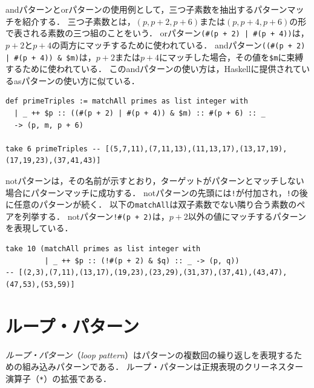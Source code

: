 andパターンとorパターンの使用例として，三つ子素数を抽出するパターンマッチを紹介する．
三つ子素数とは，$(p,p+2,p+6)$または$(p,p+4,p+6)$の形で表される素数の三つ組のことをいう．
orパターン\lstinline{(#(p + 2) | #(p + 4))}は，$p+2$と$p+4$の両方にマッチするために使われている．
andパターン\lstinline{((#(p + 2) | #(p + 4)) & $m)}は，$p+2$または$p+4$にマッチした場合，その値を\lstinline{$m}に束縛するために使われている．
このandパターンの使い方は，Haskellに提供されているasパターンの使い方に似ている．
\begin{lstlisting}[language=egison,numbers=none]
def primeTriples := matchAll primes as list integer with
  | _ ++ $p :: ((#(p + 2) | #(p + 4)) & $m) :: #(p + 6) :: _
  -> (p, m, p + 6)

take 6 primeTriples -- [(5,7,11),(7,11,13),(11,13,17),(13,17,19),(17,19,23),(37,41,43)]
\end{lstlisting}

notパターンは，その名前が示すとおり，ターゲットがパターンとマッチしない場合にパターンマッチに成功する．
notパターンの先頭には\lstinline{!}が付加され，\lstinline{!}の後に任意のパターンが続く．
以下の\lstinline{matchAll}は双子素数でない隣り合う素数のペアを列挙する．
notパターン\lstinline{!#(p + 2)}は，$p+2$以外の値にマッチするパターンを表現している．
\begin{lstlisting}[language=egison,numbers=none]
take 10 (matchAll primes as list integer with
         | _ ++ $p :: (!#(p + 2) & $q) :: _ -> (p, q))
-- [(2,3),(7,11),(13,17),(19,23),(23,29),(31,37),(37,41),(43,47),(47,53),(53,59)]
\end{lstlisting}


\section{ループ・パターン}\label{quick-loop-pat}

\emph{ループ・パターン}（\emph{loop pattern}）はパターンの複数回の繰り返しを表現するための組み込みパターンである．
ループ・パターンは正規表現のクリーネスター演算子（\lstinline{*}）の拡張である．

